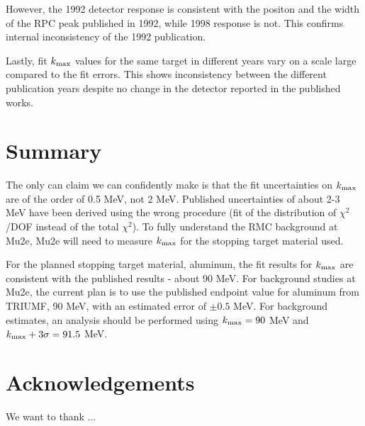 \documentclass[12pt]{article}
\newcommand {\kmax}         {\mbox{$k_{\rm max}$}}
\begin{document}
However, the 1992 detector response is consistent with the positon and the width of the 
RPC peak published in 1992, while 1998 response is not. 
This confirms internal inconsistency of the 1992 publication.

Lastly, fit $\kmax$ values for the same target in different years vary on a scale large compared
to the fit errors. This shows inconsistency between the different publication years despite
no change in the detector reported in the published works.

\section{ Summary }

The only can claim we can confidently make is that the fit uncertainties on $\kmax$ are
of the order of 0.5 MeV, not 2 MeV. Published uncertainties of about 2-3 MeV
have been derived using the wrong procedure (fit of the distribution of $\chi^2$/DOF
instead of the total $\chi^2$). To fully understand the RMC background at Mu2e,
Mu2e will need to measure $\kmax$ for the stopping target material used.


For the planned stopping target material, aluminum, the fit results for $\kmax$ are consistent with 
the published results - about 90 MeV. For background studies at Mu2e, the current plan is to use
the published endpoint value for aluminum from TRIUMF, 90 MeV, with an estimated error of 
$\pm 0.5$ MeV. For background estimates, an analysis should be performed using
$\kmax = 90$ MeV and $\kmax + 3\sigma = 91.5$ MeV.





\section{ Acknowledgements }

We want to thank ...




\appendix



\end{document}
